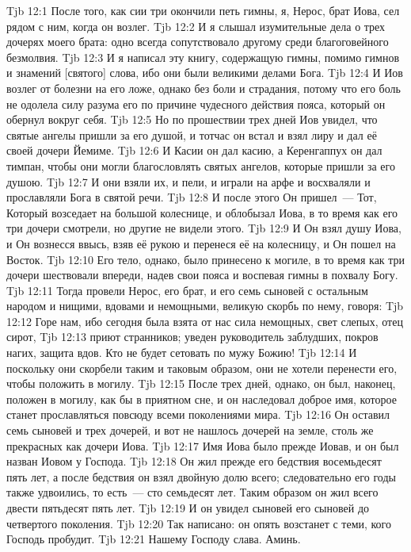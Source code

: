\vs Tjb 12:1
После того, как сии три окончили петь гимны, я, Нерос, брат Иова, сел рядом с ним, когда он возлег.
\vs Tjb 12:2
И я слышал изумительные дела о трех дочерях моего брата: одно всегда сопутствовало другому среди благоговейного безмолвия.
\vs Tjb 12:3
И я написал эту книгу, содержащую гимны, помимо гимнов и знамений [святого] слова, ибо они были великими делами Бога.
\vs Tjb 12:4
И Иов возлег от болезни на его ложе, однако без боли и страдания, потому что его боль не одолела силу разума его по причине чудесного действия пояса, который он обернул вокруг себя.
\vs Tjb 12:5
Но по прошествии трех дней Иов увидел, что святые ангелы пришли за его душой, и тотчас он встал и взял лиру и дал её своей дочери Йемиме.
\vs Tjb 12:6
И Касии он дал касию, а Керенгаппух он дал тимпан, чтобы они могли благословлять святых ангелов, которые пришли за его душою.
\vs Tjb 12:7
И они взяли их, и пели, и играли на арфе и восхваляли и прославляли Бога в святой речи.
\vs Tjb 12:8
И после этого Он пришел~--- Тот, Который возседает на большой колеснице, и облобызал Иова, в то время как его три дочери смотрели, но другие не видели этого.
\vs Tjb 12:9
И Он взял душу Иова, и Он вознесся ввысь, взяв её рукою и перенеся её на колесницу, и Он пошел на Восток.
\vs Tjb 12:10
Его тело, однако, было принесено к могиле, в то время как три дочери шествовали впереди, надев свои пояса и воспевая гимны в похвалу Богу.
\vs Tjb 12:11
Тогда провели Нерос, его брат, и его семь сыновей с остальным народом и нищими, вдовами и немощными, великую скорбь по нему, говоря:
\vs Tjb 12:12
Горе нам, ибо сегодня была взята от нас сила немощных, свет слепых, отец сирот,
\vs Tjb 12:13
приют странников; уведен руководитель заблудших, покров нагих, защита вдов. Кто не будет сетовать по мужу Божию!
\vs Tjb 12:14
И поскольку они скорбели таким и таковым образом, они не хотели перенести его, чтобы положить в могилу.
\vs Tjb 12:15
После трех дней, однако, он был, наконец, положен в могилу, как бы в приятном сне, и он наследовал доброе имя, которое станет прославляться повсюду всеми поколениями мира.
\vs Tjb 12:16
Он оставил семь сыновей и трех дочерей, и вот не нашлось дочерей на земле, столь же прекрасных как дочери Иова.
\vs Tjb 12:17
Имя Иова было прежде Иовав, и он был назван Иовом у Господа.
\vs Tjb 12:18
Он жил прежде его бедствия восемьдесят пять лет, а после бедствия он взял двойную долю всего; следовательно его годы также удвоились, то есть~--- сто семьдесят лет. Таким образом он жил всего двести пятьдесят пять лет.
\vs Tjb 12:19
И он увидел сыновей его сыновей до четвертого поколения.
\vs Tjb 12:20
Так написано: он опять возстанет с теми, кого Господь пробудит.
\vs Tjb 12:21
Нашему Господу слава. Аминь.
